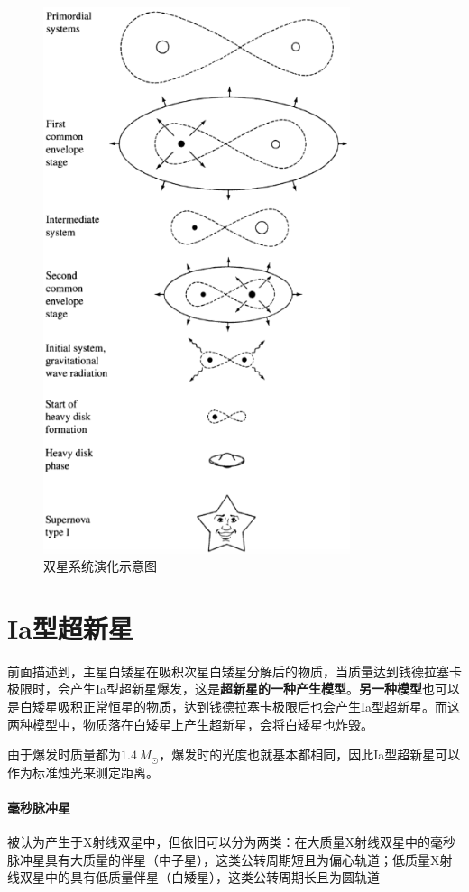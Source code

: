 \begin{figure}[hbt]
  \centering
  \includegraphics[width=9cm]{chapters/18/evolution}
  \caption{双星系统演化示意图}
  \label{fig:binaryevolution}
\end{figure}

\section{Ia型超新星}
前面描述到，主星白矮星在吸积次星白矮星分解后的物质，当质量达到钱德拉塞卡极限时，会产生Ia型超新星爆发，这是\textbf{超新星的一种产生模型}。\textbf{另一种模型}也可以是白矮星吸积正常恒星的物质，达到钱德拉塞卡极限后也会产生Ia型超新星。而这两种模型中，物质落在白矮星上产生超新星，会将白矮星也炸毁。

由于爆发时质量都为$1.4\,M_\odot$，爆发时的光度也就基本都相同，因此Ia型超新星可以作为标准烛光来测定距离。

\paragraph{毫秒脉冲星}
被认为产生于X射线双星中，但依旧可以分为两类：在大质量X射线双星中的毫秒脉冲星具有大质量的伴星（中子星），这类公转周期短且为偏心轨道；低质量X射线双星中的具有低质量伴星（白矮星），这类公转周期长且为圆轨道
